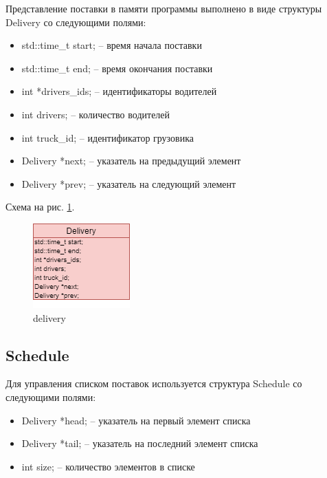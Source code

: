 Представление поставки в памяти программы выполнено в виде структуры Delivery со следующими полями:

\begin{itemize}
    \item std::time\_t start{}; -- время начала поставки
    \item std::time\_t end{}; -- время окончания поставки
    \item int *drivers\_ids{}; -- идентификаторы водителей
    \item int drivers{}; -- количество водителей
    \item int truck\_id{}; -- идентификатор грузовика
    \item Delivery *next{}; -- указатель на предыдущий элемент
    \item Delivery *prev{}; -- указатель на следующий элемент
\end{itemize}

Схема на рис. \ref{delivery}.

\begin{figure}[hpt!]
    \centering
    \includegraphics[width=0.4\linewidth]{photo/data_structures/delivery}
    \caption{delivery}
    \label{delivery}
\end{figure}

\subsection{Schedule}

Для управления списком поставок используется структура Schedule со следующими полями:

\begin{itemize}
    \item Delivery *head; -- указатель на первый элемент списка
    \item Delivery *tail; -- указатель на последний элемент списка
    \item int size; -- количество элементов в списке
\end{itemize}

